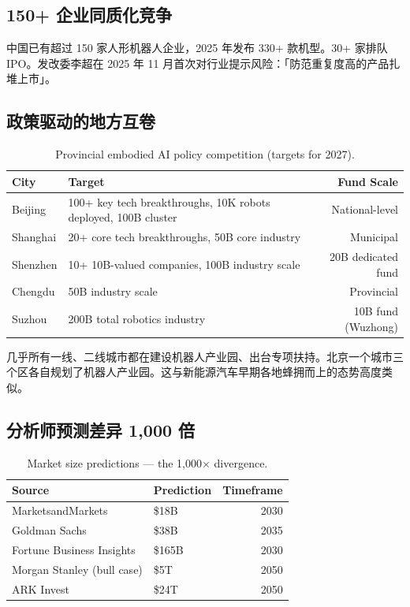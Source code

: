 \subsection{150+ 企业同质化竞争}

中国已有超过 150 家人形机器人企业，2025 年发布 330+ 款机型\cite{miit2026jan}。30+ 家排队 IPO。发改委李超在 2025 年 11 月首次对行业提示风险：「防范重复度高的产品扎堆上市」\cite{ndrc2025warning}。

\subsection{政策驱动的地方互卷}

\begin{table}[htbp]
\centering
\caption{Provincial embodied AI policy competition (targets for 2027).}
\label{tab:policies}
\begin{tabularx}{\textwidth}{lXr}
\toprule
\rowcolor{figLightGray}
\textbf{City} & \textbf{Target} & \textbf{Fund Scale} \\
\midrule
Beijing & 100+ key tech breakthroughs, 10K robots deployed, 100B cluster & National-level \\
Shanghai & 20+ core tech breakthroughs, 50B core industry & Municipal \\
Shenzhen & 10+ 10B-valued companies, 100B industry scale & 20B dedicated fund \\
Chengdu & 50B industry scale & Provincial \\
Suzhou & 200B total robotics industry & 10B fund (Wuzhong) \\
\bottomrule
\end{tabularx}
\end{table}

几乎所有一线、二线城市都在建设机器人产业园、出台专项扶持。北京一个城市三个区各自规划了机器人产业园。这与新能源汽车早期各地蜂拥而上的态势高度类似。

\subsection{分析师预测差异 1,000 倍}

\begin{table}[htbp]
\centering
\caption{Market size predictions --- the 1,000$\times$ divergence.}
\label{tab:predictions}
\begin{tabular}{llr}
\toprule
\rowcolor{figLightGray}
\textbf{Source} & \textbf{Prediction} & \textbf{Timeframe} \\
\midrule
MarketsandMarkets & \$18B & 2030 \\
Goldman Sachs & \$38B & 2035 \\
Fortune Business Insights & \$165B & 2030 \\
Morgan Stanley (bull case) & \$5T & 2050 \\
ARK Invest & \$24T & 2050 \\
\bottomrule
\end{tabular}
\end{table}

